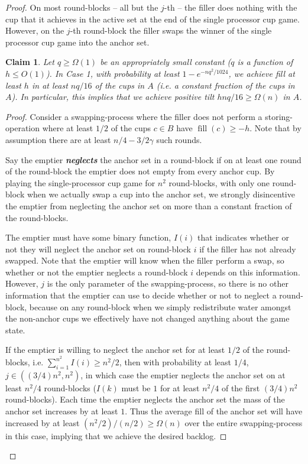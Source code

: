 \documentclass[twocolumn]{article}[10pt]
\newcommand{\defn}[1]{{\textit{\textbf{\boldmath #1}}}\xspace}
\DeclareMathOperator{\fil}{\text{fill}}
\newtheorem{clm}{Claim}
\begin{document}
\begin{proof}
On most round-blocks -- all but the $j$-th -- the filler does nothing with the
cup that it achieves in the active set at the end of the single processor cup
game. However, on the $j$-th round-block the filler swaps the winner of the
single processor cup game into the anchor set.

\begin{clm} \label{clm:reg} 
  Let $q\ge \Omega(1)$ be an appropriately small constant ($q$ is a function of
  $h\le O(1)$). In Case 1, with probability at least $1-e^{-nq^2/1024}$, we
  achieve fill at least $h$ in at least $nq/16$ of the cups in $A$ (i.e. a
  constant fraction of the cups in $A$). In particular, this implies that we
  achieve positive tilt $hnq/16 \ge \Omega(n)$ in $A$.
\end{clm}
\begin{proof}
  Consider a swapping-process where the filler does not perform a
  storing-operation where at least $1/2$ of the cups $c \in B$ have $\fil(c)
  \ge -h$. Note that by assumption there are at least $n/4 - 3/2 \gamma$ such rounds.
 
  Say the emptier \defn{neglects} the anchor set in a round-block if on at
  least one round of the round-block the emptier does not empty from every
  anchor cup. By playing the single-processor cup game for $n^2$ round-blocks,
  with only one round-block when we actually swap a cup into the anchor set, we
  strongly disincentive the emptier from neglecting the anchor set on more
  than a constant fraction of the round-blocks. 

  The emptier must have some binary function, $I(i)$ that indicates whether or
  not they will neglect the anchor set on round-block $i$ if the filler has not
  already swapped. Note that the emptier will know when the filler perform a
  swap, so whether or not the emptier neglects a round-block $i$ depends on
  this information. However, $j$ is the only parameter of the swapping-process,
  so there is no other information that the emptier can use to decide whether
  or not to neglect a round-block, because on any round-block when we simply
  redistribute water amongst the non-anchor cups we effectively have not
  changed anything about the game state. 

  If the emptier is willing to neglect the anchor set for at least $1/2$ of the
  round-blocks, i.e. $\sum_{i=1}^{n^2} I(i) \ge n^2 / 2$, then with probability
  at least $1/4$, $j \in ((3/4) n^2, n^2)$, in which case the emptier neglects
  the anchor set on at least $n^2/4$ round-blocks ($I(k)$ must be $1$ for at
  least $n^2/4$ of the first $(3/4)n^2$ round-blocks). Each time the emptier
  neglects the anchor set the mass of the anchor set increases by at least $1$.
  Thus the average fill of the anchor set will have increased by at least
  $(n^2/2)/(n/2) \ge \Omega(n)$ over the entire swapping-process in this
  case, implying that we achieve the desired backlog. 


\end{proof}
\end{proof}
\end{document}
